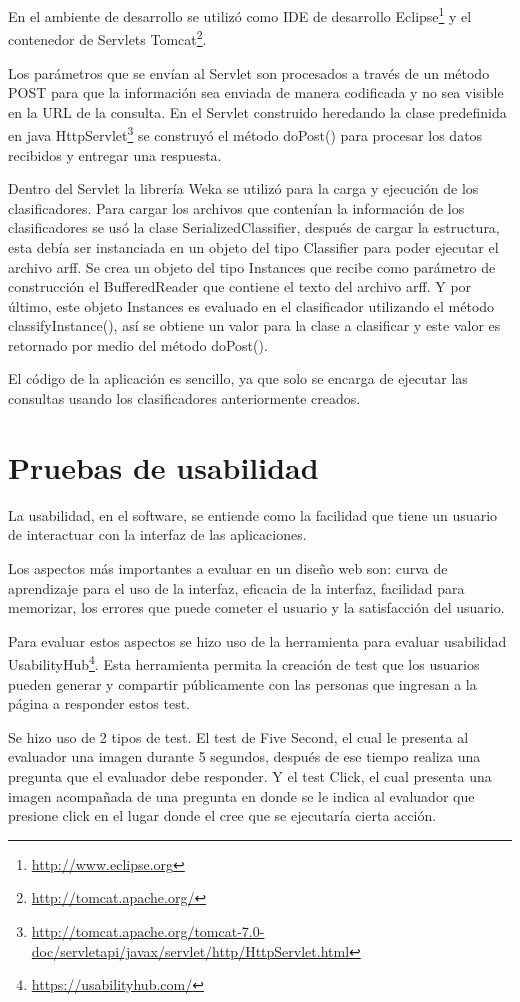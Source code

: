 En el ambiente de desarrollo se utilizó como IDE de desarrollo Eclipse\footnote{\url{http://www.eclipse.org}} y el contenedor de Servlets Tomcat\footnote{\url{http://tomcat.apache.org/}}.

Los parámetros que se envían al Servlet son procesados a través de un método POST para que la información sea enviada de manera codificada y no sea visible en la URL de la consulta. En el Servlet construido heredando la clase predefinida en java HttpServlet\footnote{\url{http://tomcat.apache.org/tomcat-7.0-doc/servletapi/javax/servlet/http/HttpServlet.html}} se construyó el método doPost() para procesar los datos recibidos y entregar una respuesta.

Dentro del Servlet la librería Weka se utilizó para la carga y ejecución de los clasificadores. Para cargar los archivos que contenían la información de los clasificadores se usó la clase SerializedClassifier, después de cargar la estructura, esta debía ser instanciada en un objeto del tipo Classifier para poder ejecutar el archivo arff. Se crea un objeto del tipo Instances que recibe como parámetro de construcción el BufferedReader que contiene el texto del archivo arff. Y por último, este objeto Instances es evaluado en el clasificador utilizando el método classifyInstance(), así se obtiene un valor para la clase a clasificar y este valor es retornado por medio del método doPost().

El código de la aplicación es sencillo, ya que solo se encarga de ejecutar las consultas usando los clasificadores anteriormente creados.
\section{Pruebas de usabilidad}
La usabilidad, en el software, se entiende como la facilidad que tiene un usuario de interactuar con la interfaz de las aplicaciones.

Los aspectos más importantes a evaluar en un diseño web son: curva de aprendizaje para el uso de la interfaz, eficacia de la interfaz, facilidad para memorizar, los errores que puede cometer el usuario y la satisfacción del usuario.

Para evaluar estos aspectos se hizo uso de la herramienta para evaluar usabilidad UsabilityHub\footnote{\url{https://usabilityhub.com/}}. Esta herramienta permita la creación de test que los usuarios pueden generar y compartir públicamente con las personas que ingresan a la página a responder estos test. 

Se hizo uso de 2 tipos de test. El test de Five Second, el cual le presenta al evaluador una imagen durante 5 segundos, después de ese tiempo realiza una pregunta que el evaluador debe responder. Y el test Click, el cual presenta una imagen acompañada de una pregunta en donde se le indica al evaluador que presione click en el lugar donde el cree que se ejecutaría cierta acción.

